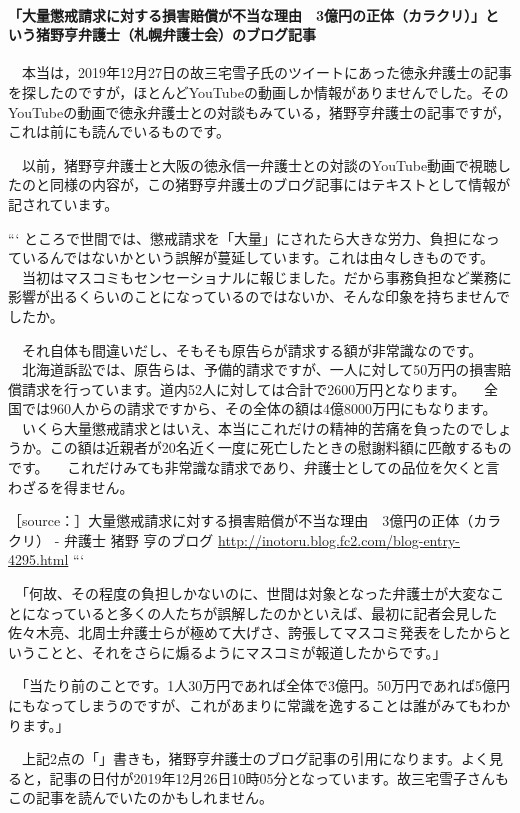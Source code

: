 \documentclass[]{ltjarticle}
\let\oldparagraph\paragraph
\renewcommand{\paragraph}[1]{\oldparagraph{#1}\mbox{}}
\begin{document}
\paragraph{「大量懲戒請求に対する損害賠償が不当な理由　3億円の正体（カラクリ）」という猪野亨弁護士（札幌弁護士会）のブログ記事}
\label{sec:orga06b345}

　本当は，2019年12月27日の故三宅雪子氏のツイートにあった徳永弁護士の記事を探したのですが，ほとんどYouTubeの動画しか情報がありませんでした。そのYouTubeの動画で徳永弁護士との対談もみている，猪野亨弁護士の記事ですが，これは前にも読んでいるものです。

　以前，猪野亨弁護士と大阪の徳永信一弁護士との対談のYouTube動画で視聴したのと同様の内容が，この猪野亨弁護士のブログ記事にはテキストとして情報が記されています。

```
ところで世間では、懲戒請求を「大量」にされたら大きな労力、負担になっているんではないかという誤解が蔓延しています。これは由々しきものです。
　当初はマスコミもセンセーショナルに報じました。だから事務負担など業務に影響が出るくらいのことになっているのではないか、そんな印象を持ちませんでしたか。

　それ自体も間違いだし、そもそも原告らが請求する額が非常識なのです。
　北海道訴訟では、原告らは、予備的請求ですが、一人に対して50万円の損害賠償請求を行っています。道内52人に対しては合計で2600万円となります。
　全国では960人からの請求ですから、その全体の額は4億8000万円にもなります。
　いくら大量懲戒請求とはいえ、本当にこれだけの精神的苦痛を負ったのでしょうか。この額は近親者が20名近く一度に死亡したときの慰謝料額に匹敵するものです。
　これだけみても非常識な請求であり、弁護士としての品位を欠くと言わざるを得ません。

［source：］大量懲戒請求に対する損害賠償が不当な理由　3億円の正体（カラクリ） - 弁護士 猪野 亨のブログ \url{http://inotoru.blog.fc2.com/blog-entry-4295.html}
```

　「何故、その程度の負担しかないのに、世間は対象となった弁護士が大変なことになっていると多くの人たちが誤解したのかといえば、最初に記者会見した佐々木亮、北周士弁護士らが極めて大げさ、誇張してマスコミ発表をしたからということと、それをさらに煽るようにマスコミが報道したからです。」

　「当たり前のことです。1人30万円であれば全体で3億円。50万円であれば5億円にもなってしまうのですが、これがあまりに常識を逸することは誰がみてもわかります。」

　上記2点の「」書きも，猪野亨弁護士のブログ記事の引用になります。よく見ると，記事の日付が2019年12月26日10時05分となっています。故三宅雪子さんもこの記事を読んでいたのかもしれません。
\end{document}
